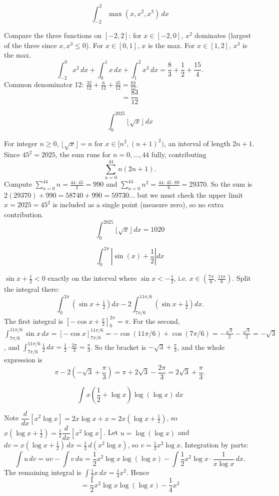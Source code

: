 \begin{questions}
\question
\[ \int_{-2}^{2}\max(x,x^2,x^3)\,dx \]
\begin{solution}
Compare the three functions on $[-2,2]$: for $x\in[-2,0]$, $x^2$ dominates (largest of the three since $x,x^3\le 0$). For $x\in[0,1]$, $x$ is the max. For $x\in[1,2]$, $x^3$ is the max.
\[ \int_{-2}^0 x^2\,dx + \int_0^1 x\,dx + \int_1^2 x^3\,dx = \frac{8}{3}+\frac12+\frac{15}{4}. \]
Common denominator 12: $\frac{32}{12}+\frac{6}{12}+\frac{45}{12}=\frac{83}{12}$.
\[ = \frac{83}{12} \]
\end{solution}

\question
\[ \int_0^{2025} \lfloor \sqrt{x}\rfloor \,dx \]
\begin{solution}
For integer $n\ge 0$, $\lfloor\sqrt x\rfloor = n$ for $x\in[n^2,(n+1)^2)$, an interval of length $2n+1$. Since $45^2=2025$, the sum runs for $n=0,\dots,44$ fully, contributing
\[ \sum_{n=0}^{44} n(2n+1). \]
Compute $\sum_{n=0}^{44} n = \frac{44\cdot45}{2}=990$ and $\sum_{n=0}^{44}n^2=\frac{44\cdot45\cdot89}{6}=29370$.
So the sum is $2(29370)+990 = 58740+990=59730$... but we must check the upper limit $x=2025=45^2$ is included as a single point (measure zero), so no extra contribution.
\[ \int_0^{2025}\lfloor\sqrt x\rfloor\,dx = 1020 \]
\end{solution}

\question
\[ \int_0^{2\pi} \left|\sin(x)+\frac12\right|dx \]
\begin{solution}
$\sin x+\tfrac12<0$ exactly on the interval where $\sin x<-\tfrac12$, i.e. $x\in(\tfrac{7\pi}{6},\tfrac{11\pi}{6})$. Split the integral there:
\[ \int_0^{2\pi}\left(\sin x+\tfrac12\right)dx - 2\int_{7\pi/6}^{11\pi/6}\left(\sin x+\tfrac12\right)dx. \]
The first integral is $[-\cos x+\tfrac{x}{2}]_0^{2\pi}=\pi$.
For the second, $\int_{7\pi/6}^{11\pi/6}\sin x\,dx=[-\cos x]_{7\pi/6}^{11\pi/6}=-\cos(11\pi/6)+\cos(7\pi/6) = -\frac{\sqrt3}{2}-\frac{\sqrt3}{2}=-\sqrt3$, and $\int_{7\pi/6}^{11\pi/6}\tfrac12\,dx=\tfrac12\cdot\tfrac{2\pi}{3}=\tfrac{\pi}{3}$.
So the bracket is $-\sqrt3+\tfrac{\pi}{3}$, and the whole expression is
\[ \pi - 2\left(-\sqrt3+\frac{\pi}{3}\right) = \pi+2\sqrt3-\frac{2\pi}{3}=2\sqrt3+\frac{\pi}{3}. \]
\end{solution}

\question
\[ \int x\left(\frac12+\log x\right)\log(\log x)\,dx \]
\begin{solution}
Note $\dfrac{d}{dx}\left[x^2\log x\right]=2x\log x+x=2x\left(\log x+\tfrac12\right)$, so $x\left(\log x+\tfrac12\right)=\tfrac12\dfrac{d}{dx}\left[x^2\log x\right]$.
Let $u=\log(\log x)$ and $dv=x(\log x+\tfrac12)\,dx=\tfrac12\,d(x^2\log x)$, so $v=\tfrac12 x^2\log x$.
Integration by parts:
\[ \int u\,dv = uv-\int v\,du = \frac12 x^2\log x\log(\log x) - \int \frac12 x^2\log x\cdot\frac{1}{x\log x}\,dx. \]
The remaining integral is $\int \tfrac12 x\,dx=\tfrac14 x^2$. Hence
\[ = \frac12 x^2\log x\log(\log x)-\frac14 x^2 \]
\end{solution}


\end{questions}
